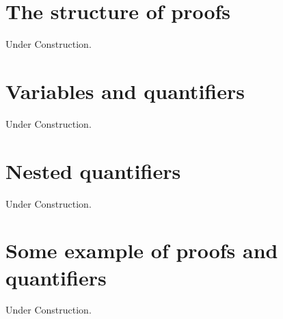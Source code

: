 \documentclass[a4paper]{book}
\begin{document}
		\section{The structure of proofs}
			Under Construction.
		\section{Variables and quantifiers}
			Under Construction.
		\section{Nested quantifiers}
			Under Construction.
		\section{Some example of proofs and quantifiers}
			Under Construction.
\end{document}
